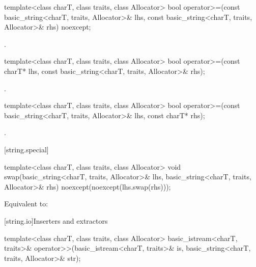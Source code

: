 %
\begin{itemdecl}
template<class charT, class traits, class Allocator>
  bool operator>=(const basic_string<charT, traits, Allocator>& lhs,
                  const basic_string<charT, traits, Allocator>& rhs) noexcept;
\end{itemdecl}

\begin{itemdescr}
\pnum
\returns
{}.
\end{itemdescr}

%
\begin{itemdecl}
template<class charT, class traits, class Allocator>
  bool operator>=(const charT* lhs,
                  const basic_string<charT, traits, Allocator>& rhs);
\end{itemdecl}

\begin{itemdescr}
\pnum
\returns
{}.
\end{itemdescr}

%
\begin{itemdecl}
template<class charT, class traits, class Allocator>
  bool operator>=(const basic_string<charT, traits, Allocator>& lhs,
                  const charT* rhs);
\end{itemdecl}

\begin{itemdescr}
\pnum
\returns
{}.
\end{itemdescr}

[string.special]{}

%
\begin{itemdecl}
template<class charT, class traits, class Allocator>
  void swap(basic_string<charT, traits, Allocator>& lhs,
            basic_string<charT, traits, Allocator>& rhs)
    noexcept(noexcept(lhs.swap(rhs)));
\end{itemdecl}

\begin{itemdescr}
\pnum
\effects
Equivalent to: 
\end{itemdescr}

[string.io]{Inserters and extractors}

%
\begin{itemdecl}
template<class charT, class traits, class Allocator>
  basic_istream<charT, traits>&
    operator>>(basic_istream<charT, traits>& is,
               basic_string<charT, traits, Allocator>& str);
\end{itemdecl}

